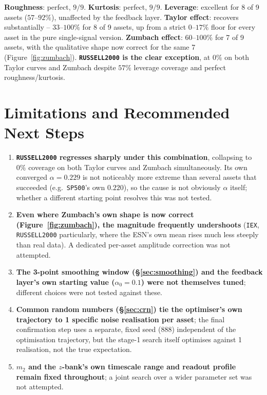 \documentclass[11pt]{article}
\begin{document}
\textbf{Roughness}: perfect, $9/9$. \textbf{Kurtosis}: perfect, $9/9$.
\textbf{Leverage}: excellent for 8 of 9 assets ($57$--$92\%$), unaffected
by the feedback layer. \textbf{Taylor effect}: recovers substantially --
$33$--$100\%$ for 8 of 9 assets, up from a strict $0$--$17\%$ floor for
every asset in the pure single-signal version. \textbf{Zumbach effect}:
$60$--$100\%$ for 7 of 9 assets, with the qualitative shape now correct
for the same 7 (Figure~\ref{fig:zumbach}). \textbf{\texttt{RUSSELL2000}
is the clear exception}, at $0\%$ on both Taylor curves and Zumbach
despite $57\%$ leverage coverage and perfect roughness/kurtosis.

\section{Limitations and Recommended Next Steps}
\begin{enumerate}
\item \textbf{\texttt{RUSSELL2000} regresses sharply under this
combination}, collapsing to $0\%$ coverage on both Taylor curves and
Zumbach simultaneously. Its own converged $\alpha=0.229$ is not
noticeably more extreme than several assets that succeeded (e.g.\
\texttt{SP500}'s own $0.220$), so the cause is not obviously $\alpha$
itself; whether a different starting point resolves this was not
tested.
\item \textbf{Even where Zumbach's own shape is now correct
(Figure~\ref{fig:zumbach}), the magnitude frequently undershoots}
(\texttt{IEX}, \texttt{RUSSELL2000} particularly, where the ESN's own
mean rises much less steeply than real data). A dedicated per-asset
amplitude correction was not attempted.
\item \textbf{The 3-point smoothing window (\S\ref{sec:smoothing}) and
the feedback layer's own starting value ($\alpha_0=0.1$) were not
themselves tuned}; different choices were not tested against these.
\item \textbf{Common random numbers (\S\ref{sec:crn}) tie the
optimiser's own trajectory to 1 specific noise realisation per asset};
the final confirmation step uses a separate, fixed seed (888) independent
of the optimisation trajectory, but the stage-1 search itself optimises
against 1 realisation, not the true expectation.
\item \textbf{$m_2$ and the $z$-bank's own timescale range and readout
profile remain fixed throughout}; a joint search over a wider parameter
set was not attempted.
\end{enumerate}
\end{document}
